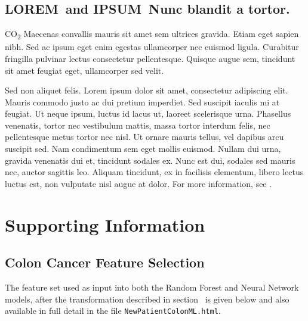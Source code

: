 \documentclass[10pt,letterpaper]{article}
\newcommand{\lorem}{{\bf LOREM}}
\newcommand{\ipsum}{{\bf IPSUM}}
\newcommand{\codewhite}[1]{\colorbox{white}{\texttt{#1}}}
\begin{document}
\subsection*{\lorem\ and \ipsum\ Nunc blandit a tortor.}

CO\textsubscript{2} Maecenas convallis mauris sit amet sem ultrices gravida. Etiam eget sapien nibh. Sed ac ipsum eget enim egestas ullamcorper nec euismod ligula. Curabitur fringilla pulvinar lectus consectetur pellentesque. Quisque augue sem, tincidunt sit amet feugiat eget, ullamcorper sed velit. 

Sed non aliquet felis. Lorem ipsum dolor sit amet, consectetur adipiscing elit. Mauris commodo justo ac dui pretium imperdiet. Sed suscipit iaculis mi at feugiat. Ut neque ipsum, luctus id lacus ut, laoreet scelerisque urna. Phasellus venenatis, tortor nec vestibulum mattis, massa tortor interdum felis, nec pellentesque metus tortor nec nisl. Ut ornare mauris tellus, vel dapibus arcu suscipit sed. Nam condimentum sem eget mollis euismod. Nullam dui urna, gravida venenatis dui et, tincidunt sodales ex. Nunc est dui, sodales sed mauris nec, auctor sagittis leo. Aliquam tincidunt, ex in facilisis elementum, libero lectus luctus est, non vulputate nisl augue at dolor. For more information, see .

\section*{Supporting Information}
\label{sec:supporting}

\subsection*{Colon Cancer Feature Selection}
\label{Colon_Cancer_Feature_Selection}


The feature set used as input into both the Random Forest and Neural Network models, after the transformation described in section~ is given below and also available in full detail in the file 
\codewhite{NewPatientColonML.html}.
\end{document}
